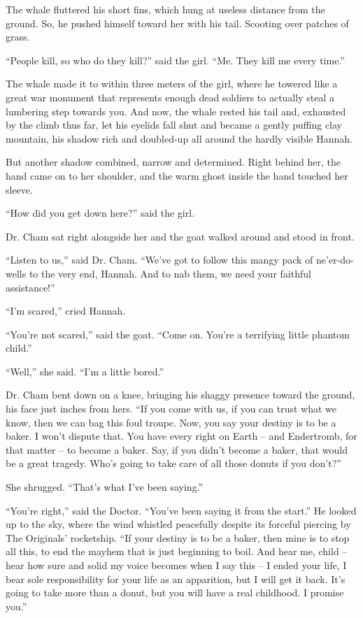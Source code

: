 \documentclass[10pt,twoside]{report}
\begin{document}
The whale fluttered his short fins, which hung at useless distance
from the ground. So, he pushed himself toward her with his tail.
Scooting over patches of grass.

``People kill, so who do they kill?'' said the girl.  ``Me.  They kill
me every time.''

The whale made it to within three meters of the girl, where he towered
like a great war monument that represents enough dead soldiers to
actually steal a lumbering step towards you.  And now, the whale
rested his tail and, exhausted by the climb thus far, let his eyelids
fall shut and became a gently puffing clay mountain, his shadow rich
and doubled-up all around the hardly visible Hannah.

But another shadow combined, narrow and determined.  Right behind her,
the hand came on to her shoulder, and the warm ghost inside the hand
touched her sleeve.

``How did you get down here?'' said the girl.

Dr. Cham sat right alongside her and the goat walked around and stood
in front.

``Listen to us,'' said Dr. Cham.  ``We've got to follow this mangy
pack of ne'er-do-wells to the very end, Hannah.  And to nab them, we
need your faithful assistance!''

``I'm scared,'' cried Hannah.

``You're not scared,'' said the goat.  ``Come on.  You're a terrifying
little phantom child.''

``Well,'' she said.  ``I'm a little bored.''

Dr. Cham bent down on a knee, bringing his shaggy presence toward the
ground, his face just inches from hers.  ``If you come with us, if you
can trust what we know, then we can bag this foul troupe.  Now, you
say your destiny is to be a baker.  I won't dispute that. You have
every right on Earth -- and Endertromb, for that matter -- to become a
baker. Say, if you didn't become a baker, that would be a great
tragedy.  Who's going to take care of all those donuts if you don't?''

She shrugged.  ``That's what I've been saying.''

``You're right,'' said the Doctor.  ``You've been saying it from the
start.''  He looked up to the sky, where the wind whistled peacefully
despite its forceful piercing by The Originals' rocketship.  ``If your
destiny is to be a baker, then mine is to stop all this, to end the
mayhem that is just beginning to boil.  And hear me, child -- hear how
sure and solid my voice becomes when I say this -- I ended your life,
I bear sole responsibility for your life as an apparition, but I will
get it back.  It's going to take more than a donut, but you will have
a real childhood.  I promise you.''
\end{document}
